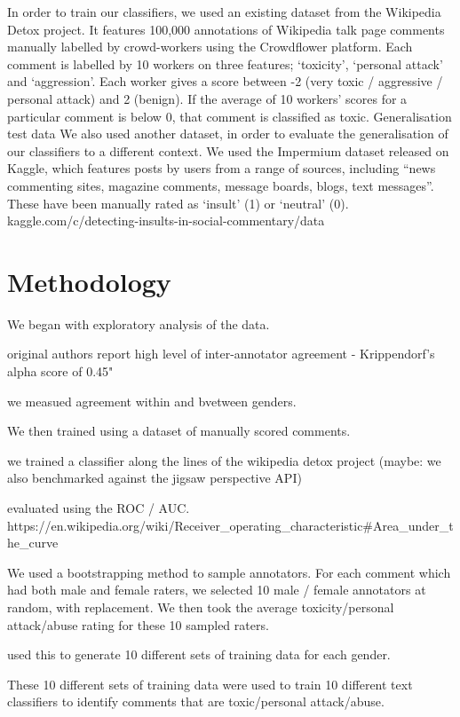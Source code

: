 \documentclass[runningheads,a4paper]{llncs}
\begin{document}
In order to train our classifiers, we used an existing dataset from the Wikipedia Detox project. It features 100,000 annotations of Wikipedia talk page comments manually labelled by crowd-workers using the Crowdflower platform. Each comment is labelled by 10 workers on three features; ‘toxicity’, ‘personal attack’ and ‘aggression’. Each worker gives a score between -2 (very toxic / aggressive / personal attack) and 2 (benign). If the average of 10 workers’ scores for a particular comment is below 0, that comment is classified as toxic.  
Generalisation test data
We also used another dataset, in order to evaluate the generalisation of our classifiers to a different context. We used the Impermium dataset released on Kaggle, which features posts by users from a range of sources, including “news commenting sites, magazine comments, message boards, blogs, text messages”. These have been manually rated as ‘insult’ (1) or ‘neutral’ (0). kaggle.com/c/detecting-insults-in-social-commentary/data



\section{Methodology}

We began with exploratory analysis of the data.

original authors report high level of inter-annotator agreement - Krippendorf’s alpha score of 0.45"

we measued agreement within and bvetween genders.

We then trained using a dataset of manually scored comments.

we trained a classifier along the lines of the wikipedia detox project
(maybe: we also benchmarked against the jigsaw perspective API)

evaluated using the ROC / AUC.
https://en.wikipedia.org/wiki/Receiver_operating_characteristic#Area_under_the_curve

We used a bootstrapping method to sample annotators. For each comment which had both male and female raters, we selected 10 male / female annotators at random, with replacement. We then took the average toxicity/personal attack/abuse rating for these 10 sampled raters. 

used this to generate 10 different sets of training data for each gender.

These 10 different sets of training data were used to train 10 different text classifiers to identify comments that are toxic/personal attack/abuse.
\end{document}
